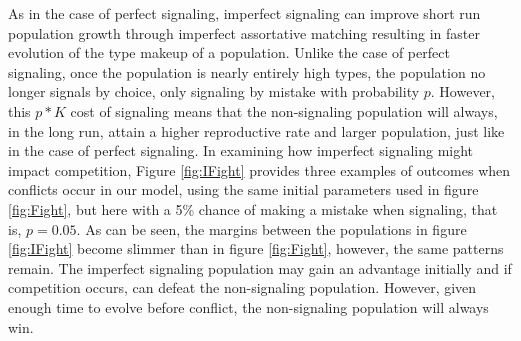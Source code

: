 As in the case of perfect signaling, imperfect signaling can improve short run population growth through imperfect assortative matching resulting in faster evolution of the type makeup of a population. Unlike the case of perfect signaling, once the population is nearly entirely high types, the population no longer signals by choice, only signaling by mistake with probability $p$. However, this $p*K$ cost of signaling means that the non-signaling population will always, in the long run, attain a higher reproductive rate and larger population, just like in the case of perfect signaling. In examining how imperfect signaling might impact competition, Figure \ref{fig:IFight} provides three examples of outcomes when conflicts occur in our model, using the same initial parameters used in figure \ref{fig:Fight}, but here with a 5\% chance of making a mistake when signaling, that is, $p =0.05$. As can be seen, the margins between the populations in figure \ref{fig:IFight} become slimmer than in figure \ref{fig:Fight}, however, the same patterns remain. The imperfect signaling population may gain an advantage initially and if competition occurs, can defeat the non-signaling population. However, given enough time to evolve before conflict, the non-signaling population will always win.
